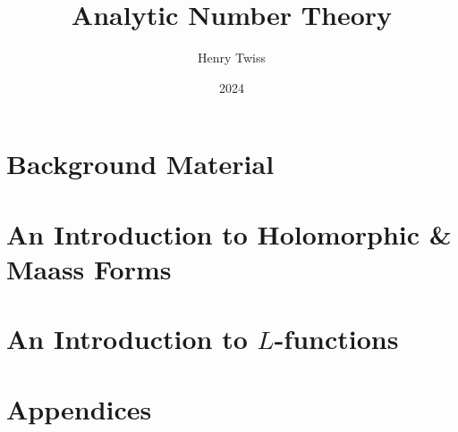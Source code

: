 \documentclass[12pt,oneside]{book}
\title{Analytic Number Theory}
\author{Henry Twiss}
\date{2024}
\begin{document}
\maketitle
\pagestyle{empty}
\tableofcontents
\setcounter{page}{0}
\pagestyle{fancy}

\part{Background Material}
  

\part{An Introduction to Holomorphic \& Maass Forms}
  
  
  
  

\part{An Introduction to \texorpdfstring{$L$}{L}-functions}
  
  
  

\iffalse
\part{An Introduction to Sieve Theory}
  
  

\part{An Introduction to Moments of \texorpdfstring{$L$}{L}-functions}
  
\fi

\part{Appendices}
  

\printindex


\end{document}
